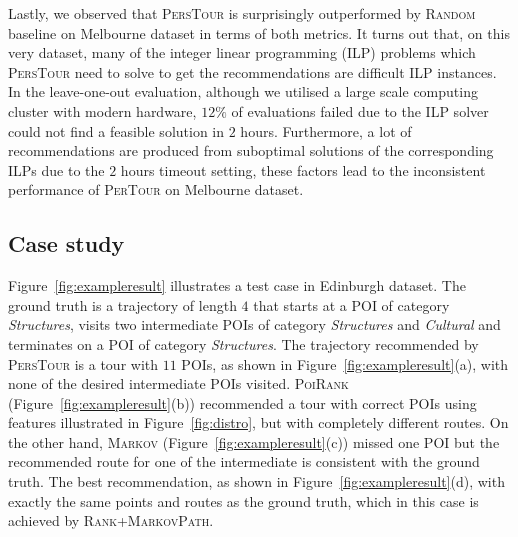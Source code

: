 Lastly, we observed that \textsc{PersTour} is surprisingly outperformed by \textsc{Random} baseline
on Melbourne dataset in terms of both metrics.
It turns out that, on this very dataset, many of the integer linear programming (ILP) problems
which \textsc{PersTour} need to solve to get the recommendations are difficult ILP instances.
In the leave-one-out evaluation, although we utilised a large scale computing cluster with modern hardware,
$12\%$ of evaluations failed due to the ILP solver could not find a feasible solution in $2$ hours.
Furthermore, a lot of recommendations are produced from suboptimal solutions of the corresponding ILPs due to
the $2$ hours timeout setting, these factors lead to the inconsistent performance of \textsc{PerTour} on Melbourne dataset.


\subsection{Case study}
\label{sec:casestudy}
\secmoveup

Figure~\ref{fig:exampleresult} illustrates a test case in Edinburgh dataset.
The ground truth is a trajectory of length $4$ that starts at a POI of category \textit{Structures},
visits two intermediate POIs of category \textit{Structures} and \textit{Cultural} and 
terminates on a POI of category \textit{Structures}.
The trajectory recommended by \textsc{PersTour} is a tour with $11$ POIs, as shown in Figure~\ref{fig:exampleresult}(a),
with none of the desired intermediate POIs visited.
\textsc{PoiRank} (Figure~\ref{fig:exampleresult}(b)) recommended a tour with correct POIs using features illustrated in Figure~\ref{fig:distro}, 
but with completely different routes.
On the other hand, \textsc{Markov} (Figure~\ref{fig:exampleresult}(c)) missed one POI but the recommended route for one of the intermediate is consistent with the ground truth.
The best recommendation, as shown in Figure~\ref{fig:exampleresult}(d), with exactly the same points and routes as the ground truth,
which in this case is achieved by \textsc{Rank+MarkovPath}.



